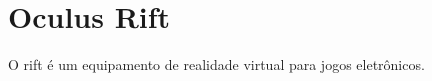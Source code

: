 \section{Oculus Rift} %
\label{sec:oculus_rift}

O \gls{rift}  é um equipamento de realidade virtual para jogos eletrônicos.